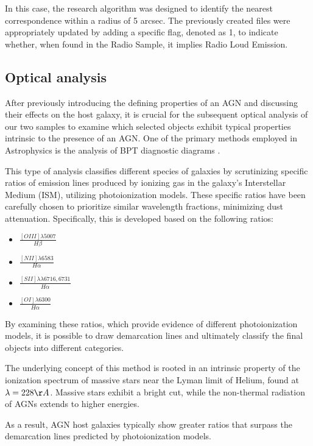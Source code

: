 In this case, the research algorithm was designed to identify the nearest correspondence within a radius of 5 arcsec. The previously created files were appropriately updated by adding a specific flag, denoted as 1, to indicate whether, when found in the Radio Sample, it implies Radio Loud Emission.

\subsection{Optical analysis}
After previously introducing the defining properties of an AGN and discussing their effects on the host galaxy, it is crucial for the subsequent optical analysis of our two samples to examine which selected objects exhibit typical properties intrinsic to the presence of an AGN. One of the primary methods employed in Astrophysics is the analysis of BPT diagnostic diagrams \cite{1981PASP...93....5B}.

This type of analysis classifies different species of galaxies by scrutinizing specific ratios of emission lines produced by ionizing gas in the galaxy's Interstellar Medium (ISM), utilizing photoionization models. These specific ratios have been carefully chosen to prioritize similar wavelength fractions, minimizing dust attenuation. Specifically, this is developed based on the following ratios:
\begin{multicols}{2}
\begin{itemize}
    \item \textbf{$\frac{[OIII]\lambda 5007}{H\beta}$}
    \item \textbf{$\frac{[NII]\lambda 6583}{H\alpha}$}
    \item \textbf{$\frac{[SII]\lambda\lambda 6716,6731}{H\alpha}$}
    \item \textbf{$\frac{[OI]\lambda 6300}{H\alpha}$}
\end{itemize}
\end{multicols}

By examining these ratios, which provide evidence of different photoionization models, it is possible to draw demarcation lines and ultimately classify the final objects into different categories.

The underlying concept of this method is rooted in an intrinsic property of the ionization spectrum of massive stars near the Lyman limit of Helium, found at $\lambda = 228\AA$. Massive stars exhibit a bright cut, while the non-thermal radiation of AGNs extends to higher energies. 

As a result, AGN host galaxies typically show greater ratios that surpass the demarcation lines predicted by photoionization models.

